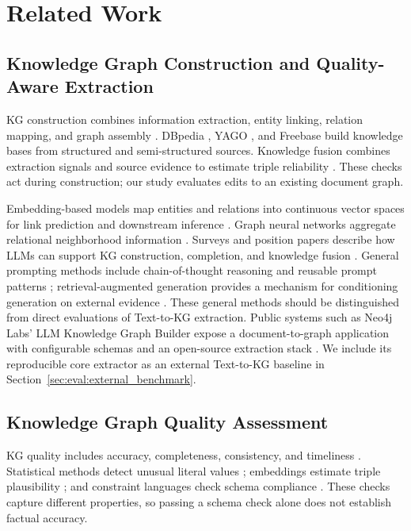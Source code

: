 \section{Related Work}
\label{sec:related_work}

\subsection{Knowledge Graph Construction and Quality-Aware Extraction}

KG construction combines information extraction, entity linking, relation
mapping, and graph assembly \citep{ref_ji2021}. DBpedia \citep{ref_auer2007},
YAGO \citep{ref_suchanek2007}, and Freebase \citep{ref_bollacker2008} build
knowledge bases from structured and semi-structured sources. Knowledge fusion
combines extraction signals and source evidence to estimate triple reliability
\citep{ref_dong2014}. These checks act during construction; our study evaluates
edits to an existing document graph.

Embedding-based models map entities and relations into continuous vector spaces for link prediction and downstream inference \citep{ref_bordes2013,ref_wang2017}. Graph neural networks aggregate relational neighborhood information \citep{ref_schlichtkrull2018}. Surveys and position papers describe how LLMs can support KG construction, completion, and knowledge fusion \citep{ref_pan2023,ref_pan2025,ref_bian2025}. General prompting methods include chain-of-thought reasoning \citep{ref_wei2023} and reusable prompt patterns \citep{ref_white2023}; retrieval-augmented generation provides a mechanism for conditioning generation on external evidence \citep{ref_lewis2020}. These general methods should be distinguished from direct evaluations of Text-to-KG extraction. Public systems such as Neo4j Labs' LLM Knowledge Graph Builder expose a document-to-graph application with configurable schemas and an open-source extraction stack \citep{ref_neo4j_llm_graph_builder}. We include its reproducible core extractor as an external Text-to-KG baseline in Section~\ref{sec:eval:external_benchmark}.

\subsection{Knowledge Graph Quality Assessment}

KG quality includes accuracy, completeness, consistency, and timeliness
\citep{ref_zaveri2016,ref_paulheim2017}. Statistical methods detect unusual
literal values \citep{ref_wienand2014,ref_paulheim2014}; embeddings estimate
triple plausibility \citep{ref_nickel2016}; and constraint languages check
schema compliance \citep{ref_kontokostas2014}. These checks capture different
properties, so passing a schema check alone does not establish factual accuracy.

